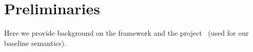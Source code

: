 \section{Preliminaries}
\label{sec:Prelim}

Here we provide background on the \K framework and the \Strata project~\cite{Heule2016a} (used for our baseline semantics).


%



